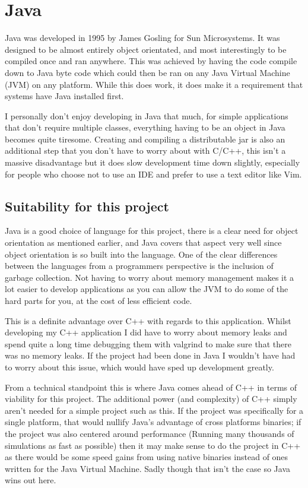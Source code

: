 \documentclass[10pt]{article}
\begin{document}
  \section{Java}
  Java was developed in 1995 by James Gosling for Sun Microsystems. It was designed to be almost entirely object orientated, and most interestingly to be compiled once and ran anywhere. This was achieved by having the code compile down to Java byte code which could then be ran on any Java Virtual Machine (JVM) on any platform. While this does work, it does make it a requirement that systems have Java installed first. 

  I personally don't enjoy developing in Java that much, for simple applications that don't require multiple classes, everything having to be an object in Java becomes quite tiresome. Creating and compiling a distributable jar is also an additional step that you don't have to worry about with C/C++, this isn't a massive disadvantage but it does slow development time down slightly, especially for people who choose not to use an IDE and prefer to use a text editor like Vim.

  \subsection{Suitability for this project}
  Java is a good choice of language for this project, there is a clear need for object orientation as mentioned earlier, and Java covers that aspect very well since object orientation is so built into the language. One of the clear differences between the languages from a programmers perspective is the inclusion of garbage collection. Not having to worry about memory management makes it a lot easier to develop applications as you can allow the JVM to do some of the hard parts for you, at the cost of less efficient code. 

  This is a definite advantage over C++ with regards to this application. Whilst developing my C++ application I did have to worry about memory leaks and spend quite a long time debugging them with valgrind to make sure that there was no memory leaks. If the project had been done in Java I wouldn't have had to worry about this issue, which would have sped up development greatly. 

  From a technical standpoint this is where Java comes ahead of C++ in terms of viability for this project. The additional power (and complexity) of C++ simply aren't needed for a simple project such as this. If the project was specifically for a single platform, that would nullify Java's advantage of cross platforms binaries; if the project was also centered around performance (Running many thousands of simulations as fast as possible) then it may make sense to do the project in C++ as there would be some speed gains from using native binaries instead of ones written for the Java Virtual Machine. Sadly though that isn't the case so Java wins out here. 
\end{document}
